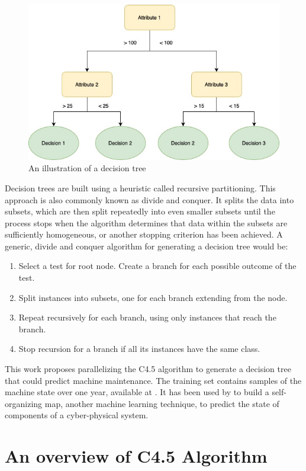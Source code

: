 \documentclass[conference]{IEEEtran}
\begin{document}
\begin{figure}[h]
    \centering
    \includegraphics[width=0.8\linewidth]{images/decision-trees.jpg}
    \caption{An illustration of a decision tree}
    \label{fig:dtree}
\end{figure}

Decision trees are built using a heuristic called recursive partitioning. This approach is also commonly known as divide and conquer. It splits the data into subsets, which are then split repeatedly into even smaller subsets until the process stops when the algorithm determines that data within the subsets are sufficiently homogeneous, or another stopping criterion has been achieved. A generic, divide and conquer algorithm for generating a decision tree would be:

\begin{enumerate}
    \item Select a test for root node. Create a branch for each possible outcome of the test.
    \item Split instances into subsets, one for each branch extending from the node.
    \item Repeat recursively for each branch, using only instances that reach the branch.
    \item Stop recursion for a branch if all its instances have the same class.
\end{enumerate}

This work proposes parallelizing the C4.5 algorithm to generate a decision tree that could predict machine maintenance. The training set contains samples of the machine state over one year, available at \cite{data}. It has been used by \cite{birgelen} to build a self-organizing map, another machine learning technique, to predict the state of components of a cyber-physical system.

\section{An overview of C4.5 Algorithm}
\end{document}
